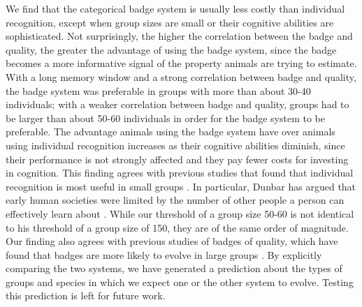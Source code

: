 We find that the categorical badge system is usually less costly than individual recognition, except when group sizes are small or their cognitive abilities are sophisticated. Not surprisingly, the higher the correlation between the badge and quality, the greater the advantage of using the badge system, since the badge becomes a more informative signal of the property animals are trying to estimate. With a long memory window and a strong correlation between badge and quality, the badge system was preferable in groups with more than about 30-40 individuals; with a weaker correlation between badge and quality, groups had to be larger than about 50-60 individuals in order for the badge system to be preferable. The advantage animals using the badge system have over animals using individual recognition increases as their cognitive abilities diminish, since their performance is not strongly affected and they pay fewer costs for investing in cognition. This finding agrees with previous studies that found that individual recognition is most useful in small groups \cite{Veiga:1993fk}. In particular, Dunbar has argued that early human societies were limited by the number of other people a person can effectively learn about \cite{Dunbar:1993zr,Hill:2003ly}. While our threshold of a group size 50-60 is not identical to his threshold of a group size of 150, they are of the same order of magnitude. Our finding also agrees with previous studies of badges of quality, which have found that badges are more likely to evolve in large groups \cite{Rohwer:1975fk,Tibbetts:2009kx}. By explicitly comparing the two systems, we have generated a prediction about the types of groups and species in which we expect one or the other system to evolve. Testing this prediction is left for future work. 




